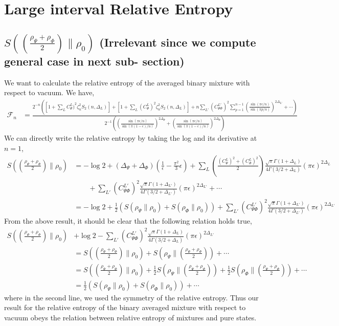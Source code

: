 \documentclass[11pt]{article}
\newcommand{\ep}{\epsilon}
\newcommand{\nn}{\nonumber}
\newcommand{\lb}{\left(}
\newcommand{\rb}{\right)}
\begin{document}
\section{Large interval Relative Entropy}
\subsection{\texorpdfstring{$S\lb \lb\frac{\rho_\Psi + \rho_\Phi}{2}\rb\big\| \rho_0\rb$ (Irrelevant since we compute general case in next sub-
section)}{S averaged binary mixture wrt vacuum}}
We want to calculate the relative entropy of the averaged binary mixture with respect to vacuum. We have,
\begin{align}
    \mathcal{F}_n &= \frac{2^{-n} \lb  [1+ \sum_L{C_{\Psi}^L)}^2\zeta_n^2 S_2(n,\Delta_L)] +[1+ \sum_L{(C_{\Phi}^L)}^2\zeta_n^2 S_2(n,\Delta_L)]  + n\sum_{L'}{(C_{\Psi\Phi}^{L'})}^2\sum_{p=1}^{n-1}\lb\frac{\sin (\pi \ep/n)}{\sin (\pi p/n)}\rb^{2\Delta_{L'}}+  \cdots\rb}{2^{-1}\lb \lb\frac{\sin (\pi \ep/n)}{\sin (\pi (1-\ep)/n)}\rb^{2\Delta_{\Psi}}+\lb\frac{\sin (\pi \ep/n)}{\sin (\pi (1-\ep)/n)}\rb^{2\Delta_{\Phi}} \rb}
\end{align}
We can directly write the relative entropy by taking the log and its derivative at $n=1$,
\begin{align}
    S\lb \lb\frac{\rho_\Psi + \rho_\Phi}{2}\rb\Big\| \rho_0\rb &= -\log 2+ \lb\Delta_\Psi + \Delta_\Phi\rb \lb\frac{1}{\ep} - \frac{\pi^2}{3}\ep \rb + \sum_L\lb\frac{{(C_{\Psi}^L)}^2 + {(C_{\Phi}^L)}^2}{2} \rb \frac{\sqrt{\pi }\Gamma(1+\Delta_{L})}{4\Gamma(3/2+\Delta_{L})}(\pi \ep)^{2\Delta_{L}} \nn\\
    &\qquad + \sum_{L'}{(C_{\Psi\Phi}^{L'})}^2\frac{\sqrt{\pi }\Gamma(1+\Delta_{L'})}{4\Gamma(3/2+\Delta_{L'})}(\pi \ep)^{2\Delta_{L'}} +\cdots\\
    &= -\log 2 + \frac{1}{2}\lb S(\rho_\Psi \| \rho_0) + S(\rho_\Phi \| \rho_0) \rb + \sum_{L'}{(C_{\Psi\Phi}^{L'})}^2\frac{\sqrt{\pi }\Gamma(1+\Delta_{L'})}{4\Gamma(3/2+\Delta_{L'})}(\pi \ep)^{2\Delta_{L'}}
\end{align}
From the above result, it should be clear that the following relation holds true,
\begin{align}
    S\lb \lb\frac{\rho_\Psi + \rho_\Phi}{2}\rb\Big\| \rho_0\rb &+ \log 2 - \sum_{L'}{(C_{\Psi\Phi}^{L'})}^2\frac{\sqrt{\pi }\Gamma(1+\Delta_L)}{4\Gamma(3/2+\Delta_L)}(\pi \ep)^{2\Delta_{L'}}\\
    &= S\lb \lb\frac{\rho_\Psi + \rho_\Phi}{2}\rb\Big\| \rho_0\rb + S\lb\rho_\Psi \Big\| \lb\frac{\rho_\Psi + \rho_\Phi}{2}\rb\rb + \cdots\\
     &=S\lb \lb\frac{\rho_\Psi + \rho_\Phi}{2}\rb\Big\| \rho_0\rb + \frac{1}{2}S\lb\rho_\Psi \Big\| \lb\frac{\rho_\Psi + \rho_\Phi}{2}\rb\rb + \frac{1}{2}S\lb\rho_\Phi \Big\| \lb\frac{\rho_\Psi + \rho_\Phi}{2}\rb\rb+\cdots \\ 
     &= 
     \frac{1}{2}\lb S(\rho_\Psi \| \rho_0) + S(\rho_\Phi \| \rho_0) \rb + \cdots
\end{align}
where in the second line, we used the symmetry of the relative entropy.
Thus our result for the relative entropy of the binary averaged mixture with respect to vacuum obeys the relation between relative entropy of mixtures and pure states.
\end{document}
